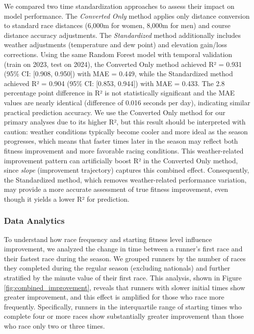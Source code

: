 \documentclass[suppldata]{interact}
\theoremstyle{plain}%
\theoremstyle{definition}
\theoremstyle{remark}
\begin{document}
We compared two time standardization approaches to assess their impact on model performance. The \textit{Converted Only} method applies only distance conversion to standard race distances (6,000m for women, 8,000m for men) and course distance accuracy adjustments. The \textit{Standardized} method additionally includes weather adjustments (temperature and dew point) and elevation gain/loss corrections. Using the same Random Forest model with temporal validation (train on 2023, test on 2024), the Converted Only method achieved R² = 0.931 (95\% CI: [0.908, 0.950]) with MAE = 0.449, while the Standardized method achieved R² = 0.904 (95\% CI: [0.853, 0.944]) with MAE = 0.433. The 2.8 percentage point difference in R² is not statistically significant and the MAE values are nearly identical (difference of 0.016 seconds per day), indicating similar practical prediction accuracy. We use the Converted Only method for our primary analyses due to its higher R², but this result should be interpreted with caution: weather conditions typically become cooler and more ideal as the season progresses, which means that faster times later in the season may reflect both fitness improvement and more favorable racing conditions. This weather-related improvement pattern can artificially boost R² in the Converted Only method, since \textit{slope} (improvement trajectory) captures this combined effect. Consequently, the Standardized method, which removes weather-related performance variation, may provide a more accurate assessment of true fitness improvement, even though it yields a lower R² for prediction.

\FloatBarrier

\subsubsection{Data Analytics}

To understand how race frequency and starting fitness level influence improvement, we analyzed the change in time between a runner's first race and their fastest race during the season. We grouped runners by the number of races they completed during the regular season (excluding nationals) and further stratified by the minute value of their first race. This analysis, shown in Figure \ref{fig:combined_improvement}, reveals that runners with slower initial times show greater improvement, and this effect is amplified for those who race more frequently. Specifically, runners in the interquartile range of starting times who complete four or more races show substantially greater improvement than those who race only two or three times.
\end{document}
